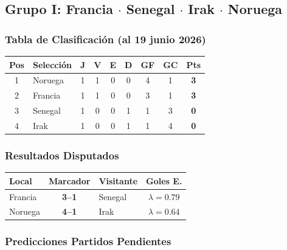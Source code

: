 \documentclass[11pt,a4paper]{article}
\begin{document}
\subsection{Grupo I: Francia $\cdot$ Senegal $\cdot$ Irak $\cdot$ Noruega}

\subsubsection*{Tabla de Clasificación (al 19 junio 2026)}


\begin{center}
\begin{tabular}{@{}clccccccc@{}}
\toprule
\textbf{Pos} & \textbf{Selección} & \textbf{J} & \textbf{V} & \textbf{E} & \textbf{D} & \textbf{GF} & \textbf{GC} & \textbf{Pts} \\
\midrule
  \cellcolor{green!25}1 & \cellcolor{green!25}Noruega & 1 & 1 & 0 & 0 & 4 & 1 & \textbf{3} \\
  \cellcolor{green!25}2 & \cellcolor{green!25}Francia & 1 & 1 & 0 & 0 & 3 & 1 & \textbf{3} \\
  \cellcolor{yellow!20}3 & \cellcolor{yellow!20}Senegal & 1 & 0 & 0 & 1 & 1 & 3 & \textbf{0} \\
  4 & Irak & 1 & 0 & 0 & 1 & 1 & 4 & \textbf{0} \\
\bottomrule
\end{tabular}
\end{center}

\subsubsection*{Resultados Disputados}

\begin{center}
\begin{tabular}{@{}lclc@{}}
\toprule
\textbf{Local} & \textbf{Marcador} & \textbf{Visitante} & \textbf{Goles E.} \\
\midrule
  Francia & \textbf{3--1} & Senegal & $\lambda=0.79$ \\
  Noruega & \textbf{4--1} & Irak & $\lambda=0.64$ \\
\bottomrule
\end{tabular}
\end{center}

\subsubsection*{Predicciones Partidos Pendientes}
\end{document}
